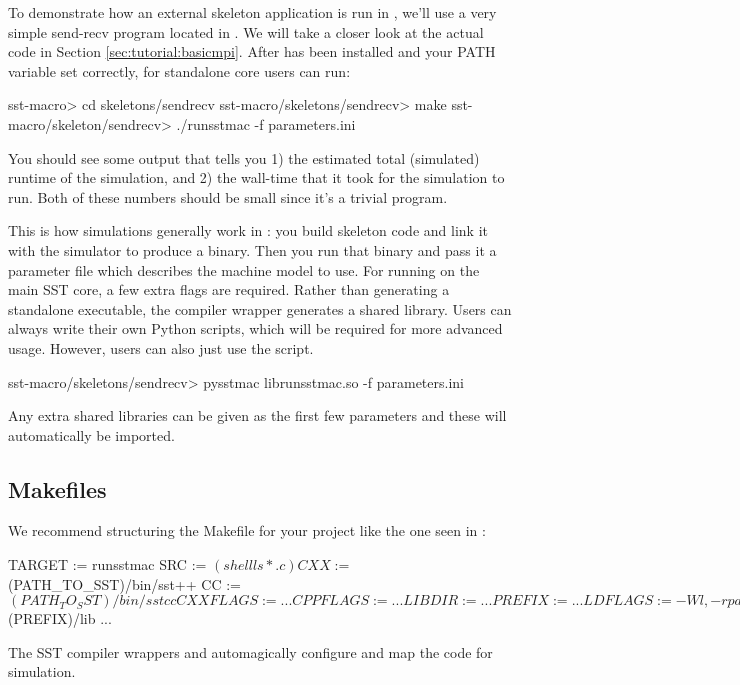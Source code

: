 To demonstrate how an external skeleton application is run in \sstmacro, we'll use a very simple send-recv program located in .
We will take a closer look at the actual code in Section \ref{sec:tutorial:basicmpi}.
After \sstmacro has been installed and your PATH variable set correctly, for standalone core users can run:

\begin{ShellCmd}
sst-macro> cd skeletons/sendrecv
sst-macro/skeletons/sendrecv> make
sst-macro/skeleton/sendrecv> ./runsstmac -f parameters.ini
\end{ShellCmd}

You should see some output that tells you 1) the estimated total (simulated) runtime of the simulation, and 
2) the wall-time that it took for the simulation to run.  
Both of these numbers should be small since it's a trivial program. 

This is how simulations generally work in \sstmacro: you build skeleton code and link it with the simulator to produce a binary.  
Then you run that binary and pass it a parameter file which describes the machine model to use.  For running on the main SST core, a few extra flags are required.  Rather than generating a standalone executable, the compiler wrapper generates a shared library. Users can always write their own Python scripts, which will be required for more advanced usage. However, users can also just use the  script.

\begin{ShellCmd}
sst-macro/skeletons/sendrecv> pysstmac librunsstmac.so -f parameters.ini
\end{ShellCmd}
Any extra shared libraries can be given as the first few parameters and these will automatically be imported.

\subsection{Makefiles}
\label{subsec:tutorial:makefiles}

We recommend structuring the Makefile for your project like the one seen in  :

\begin{ViFile}
TARGET := runsstmac
SRC := $(shell ls *.c) 

CXX :=      $(PATH_TO_SST)/bin/sst++
CC :=        $(PATH_TO_SST)/bin/sstcc
CXXFLAGS := ...
CPPFLAGS := ...
LIBDIR :=  ...
PREFIX :=   ...
LDFLAGS :=  -Wl,-rpath,$(PREFIX)/lib
...
\end{ViFile}
The SST compiler wrappers  and  automagically configure and map the code for simulation. 

